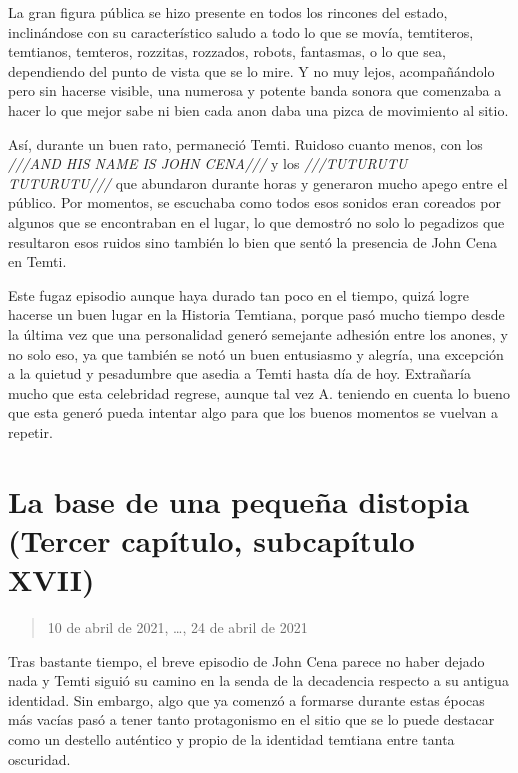 \documentclass[
  spanish,
]{book}
\begin{document}
La gran figura pública se hizo presente en todos los rincones del estado, inclinándose con su característico saludo a todo lo que se movía, temtiteros, temtianos, temteros, rozzitas, rozzados, robots, fantasmas, o lo que sea, dependiendo del punto de vista que se lo mire. Y no muy lejos, acompañándolo pero sin hacerse visible, una numerosa y potente banda sonora que comenzaba a hacer lo que mejor sabe ni bien cada anon daba una pizca de movimiento al sitio.

Así, durante un buen rato, permaneció Temti. Ruidoso cuanto menos, con los \emph{///AND HIS NAME IS JOHN CENA///} y los \emph{///TUTURUTU TUTURUTU///} que abundaron durante horas y generaron mucho apego entre el público. Por momentos, se escuchaba como todos esos sonidos eran coreados por algunos que se encontraban en el lugar, lo que demostró no solo lo pegadizos que resultaron esos ruidos sino también lo bien que sentó la presencia de John Cena en Temti.

Este fugaz episodio aunque haya durado tan poco en el tiempo, quizá logre hacerse un buen lugar en la Historia Temtiana, porque pasó mucho tiempo desde la última vez que una personalidad generó semejante adhesión entre los anones, y no solo eso, ya que también se notó un buen entusiasmo y alegría, una excepción a la quietud y pesadumbre que asedia a Temti hasta día de hoy. Extrañaría mucho que esta celebridad regrese, aunque tal vez A. teniendo en cuenta lo bueno que esta generó pueda intentar algo para que los buenos momentos se vuelvan a repetir.

\hypertarget{la-base-de-una-pequeuxf1a-distopia-tercer-capuxedtulo-subcapuxedtulo-xvii}{%
\section{La base de una pequeña distopia (Tercer capítulo, subcapítulo XVII)}\label{la-base-de-una-pequeuxf1a-distopia-tercer-capuxedtulo-subcapuxedtulo-xvii}}

\begin{quote}
10 de abril de 2021, \ldots, 24 de abril de 2021
\end{quote}

Tras bastante tiempo, el breve episodio de John Cena parece no haber dejado nada y Temti siguió su camino en la senda de la decadencia respecto a su antigua identidad. Sin embargo, algo que ya comenzó a formarse durante estas épocas más vacías pasó a tener tanto protagonismo en el sitio que se lo puede destacar como un destello auténtico y propio de la identidad temtiana entre tanta oscuridad.
\end{document}
